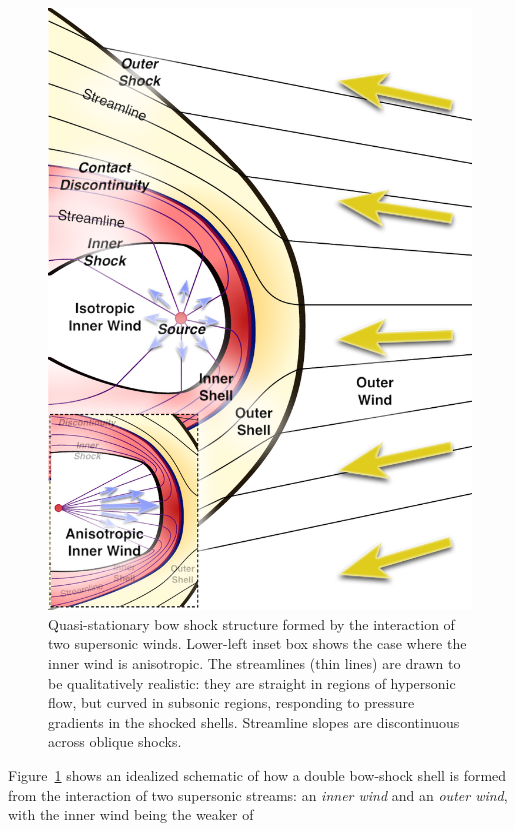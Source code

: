 \begin{figure}
  \includegraphics[width=\linewidth]{figs/generic-bowshock}
  \caption{Quasi-stationary bow shock structure formed by the
    interaction of two supersonic winds.  Lower-left inset box shows
    the case where the inner wind is anisotropic. The streamlines
    (thin lines) are drawn to be qualitatively realistic: they are
    straight in regions of hypersonic flow, but curved in subsonic
    regions, responding to pressure gradients in the shocked
    shells. Streamline slopes are discontinuous across oblique
    shocks.}
\label{fig:2-winds}
\end{figure}
\newcommand\Mach{\ensuremath{\mathcal{M}}} Figure~\ref{fig:2-winds}
shows an idealized schematic of how a double bow-shock shell is formed
from the interaction of two supersonic streams: an \textit{inner wind}
and an \textit{outer wind}, with the inner wind being the weaker of
